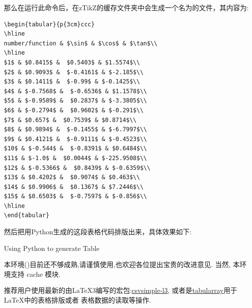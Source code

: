 那么在运行此命令后，在zTikZ的缓存文件夹中会生成一个名为的文件，其内容为:
\begin{verbatim}
\begin{tabular}{p{3cm}ccc}
\hline
number/function & $\sin$ & $\cos$ & $\tan$\\
\hline
$1$ & $0.8415$ &  $0.5403$ & $1.5574$\\
$2$ & $0.9093$ &  $-0.4161$ & $-2.185$\\
$3$ & $0.1411$ &  $-0.99$ & $-0.1425$\\
$4$ & $-0.7568$ &  $-0.6536$ & $1.1578$\\
$5$ & $-0.9589$ &  $0.2837$ & $-3.3805$\\
$6$ & $-0.2794$ &  $0.9602$ & $-0.291$\\
$7$ & $0.657$ &  $0.7539$ & $0.8714$\\
$8$ & $0.9894$ &  $-0.1455$ & $-6.7997$\\
$9$ & $0.4121$ &  $-0.9111$ & $-0.4523$\\
$10$ & $-0.544$ &  $-0.8391$ & $0.6484$\\
$11$ & $-1.0$ &  $0.0044$ & $-225.9508$\\
$12$ & $-0.5366$ &  $0.8439$ & $-0.6359$\\
$13$ & $0.4202$ &  $0.9074$ & $0.463$\\
$14$ & $0.9906$ &  $0.1367$ & $7.2446$\\
$15$ & $0.6503$ &  $-0.7597$ & $-0.856$\\
\hline
\end{tabular}
\end{verbatim}

然后把用Python生成的这段表格代码排版出来，具体效果如下:
\begin{table}[H]
    \centering
    
    \caption{Using Python to generate Table}
\end{table}

\begin{remark}
本环境()目前还不够成熟,请谨慎使用,也欢迎各位提出宝贵的改进意见. 
当然, 本环境支持 cache 模块.
\end{remark}

\begin{remark}
推荐用户使用最新的由\LaTeX3编写的宏包:\href{https://mirror-hk.koddos.net/CTAN/macros/latex/contrib/csvsimple/csvsimple-l3.pdf}{csvsimple-l3},
或者是\href{https://mirror-hk.koddos.net/CTAN/macros/latex/contrib/tabularray/tabularray.pdf}{tabularray}用于\LaTeX{}中的表格排版或者
表格数据的读取等操作.
\end{remark}

